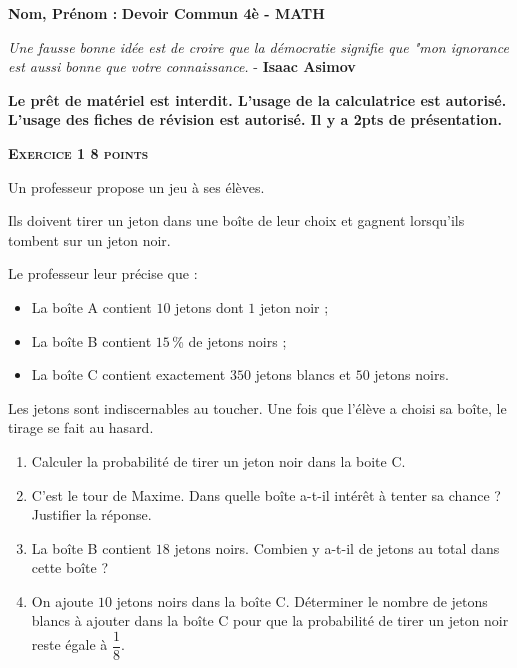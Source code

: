 



\textbf{Nom, Prénom :} \hspace{8cm} \textbf{Devoir Commun 4è - MATH} 

\begin{center}
  \textit{Une fausse bonne idée est de croire que la démocratie signifie que "mon ignorance est aussi bonne que votre connaissance.}  - \textbf{Isaac Asimov}
\end{center}

\textbf{Le prêt de matériel est interdit. L’usage de la calculatrice est autorisé. L'usage des fiches de révision est autorisé. Il y a 2pts de présentation.}

\vspace{1cm}

\textbf{\textsc{Exercice 1 \hfill 8 points}}


Un professeur propose un jeu à ses élèves.

Ils doivent tirer un jeton dans une boîte de leur choix et gagnent lorsqu'ils tombent sur un jeton noir. 

Le professeur leur précise que :

\setlength\parindent{1cm}
\begin{itemize}
  \item La boîte A contient $10$ jetons dont $1$ jeton noir ;
  \item La boîte B contient $15$\,\% de jetons noirs ;
  \item La boîte C contient exactement $350$ jetons blancs et $50$ jetons noirs.
\end{itemize}
\setlength\parindent{0cm}

\medskip

Les jetons sont indiscernables au toucher. Une fois que l'élève a choisi sa boîte, le tirage se fait au hasard.

\medskip

\begin{enumerate}
  \item Calculer la probabilité de tirer un jeton noir dans la boite C.
  \item C'est le tour de Maxime. Dans quelle boîte a-t-il intérêt à tenter sa chance ? Justifier la réponse.
  \item La boîte B contient $18$ jetons noirs. Combien y a-t-il de jetons au total dans cette boîte  ? 
  \item  On ajoute $10$ jetons noirs dans la boîte C. Déterminer le nombre de jetons blancs à ajouter dans la boîte C pour que la probabilité de tirer un jeton noir reste égale à $\dfrac{1}{8}$.
\end{enumerate}

